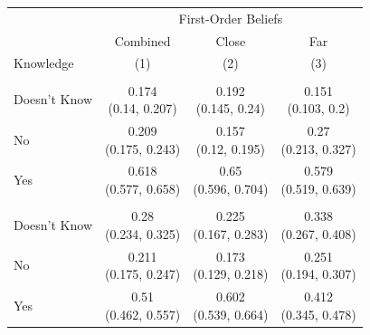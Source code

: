 
\centering

\centering
\begin{tabular}[t]{lccc}
\toprule
\multicolumn{1}{c}{ } & \multicolumn{3}{c}{First-Order Beliefs} \\
\cmidrule(l{3pt}r{3pt}){2-4}
\multicolumn{1}{c}{ } & \multicolumn{1}{c}{Combined} & \multicolumn{1}{c}{Close} & \multicolumn{1}{c}{Far} \\
Knowledge & (1) & (2) & (3)\\
\midrule
\addlinespace[0.3em]
\hline
\multicolumn{4}{l}{\textbf{Bracelet}}\\
\hline
\hspace{1em}Doesn't Know & \makecell[c]{0.174\\(0.14, 0.207)} & \makecell[c]{0.192\\(0.145, 0.24)} & \makecell[c]{0.151\\(0.103, 0.2)}\\
\hspace{1em}No & \makecell[c]{0.209\\(0.175, 0.243)} & \makecell[c]{0.157\\(0.12, 0.195)} & \makecell[c]{0.27\\(0.213, 0.327)}\\
\hspace{1em}Yes & \makecell[c]{0.618\\(0.577, 0.658)} & \makecell[c]{0.65\\(0.596, 0.704)} & \makecell[c]{0.579\\(0.519, 0.639)}\\
\addlinespace[0.3em]
\hline
\multicolumn{4}{l}{\textbf{Calendar}}\\
\hline
\hspace{1em}Doesn't Know & \makecell[c]{0.28\\(0.234, 0.325)} & \makecell[c]{0.225\\(0.167, 0.283)} & \makecell[c]{0.338\\(0.267, 0.408)}\\
\hspace{1em}No & \makecell[c]{0.211\\(0.175, 0.247)} & \makecell[c]{0.173\\(0.129, 0.218)} & \makecell[c]{0.251\\(0.194, 0.307)}\\
\hspace{1em}Yes & \makecell[c]{0.51\\(0.462, 0.557)} & \makecell[c]{0.602\\(0.539, 0.664)} & \makecell[c]{0.412\\(0.345, 0.478)}\\

\end{tabular}
